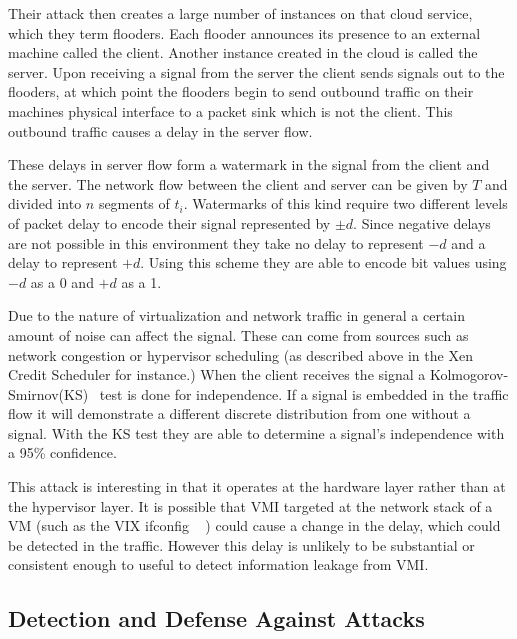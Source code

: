 Their attack then creates a large number of instances on that cloud service, which they term flooders. Each flooder announces its presence to an external machine called the client. Another instance created in the cloud is called the server. Upon receiving a signal from the server the client sends signals out to the flooders, at which point the flooders begin to send outbound traffic on their machines physical interface to a packet sink which is not the client. This outbound traffic causes a delay in the server flow. 

These delays in server flow form a watermark in the signal from the client and the server. The network flow between the client and server can be given by $T$ and divided into $n$ segments of $t_i$. Watermarks of this kind require two different levels of packet delay to encode their signal represented by $\pm d$. Since negative delays are not possible in this environment they take no delay to represent $-d$ and a delay to represent $+d$. Using this scheme they are able to encode bit values using $-d$ as a 0 and $+d$ as a 1. 

Due to the nature of virtualization and network traffic in general a certain amount of noise can affect the signal. These can come from sources such as network congestion or hypervisor scheduling (as described above in the Xen Credit Scheduler for instance.) When the client receives the signal a Kolmogorov-Smirnov(KS)~\cite{pettitt_kolmogorov-smirnov_1977} test is done for independence. If a signal is embedded in the traffic flow it will demonstrate a different discrete distribution from one without a signal. With the KS test they are able to determine a signal's independence with a 95\% confidence. 

This attack is interesting in that it operates at the hardware layer rather than at the hypervisor layer. It is possible that VMI targeted at the network stack of a VM (such as the VIX ifconfig ~\cite{hay_forensics_2008} ) could cause a change in the delay, which could be detected in the traffic. However this delay is unlikely to be substantial or consistent enough to useful to detect information leakage from VMI.

\subsection{Detection and Defense Against Attacks}

